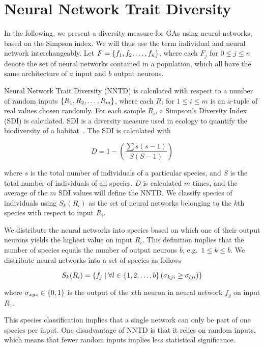 \section{Neural Network Trait Diversity}
In the following, we present a diversity measure for GAs using neural networks, based on the Simpson index. We will thus use the term individual and neural network interchangeably. Let $F = \{ f_1, f_2, \dots, f_n \}$, where each $F_j$ for $0 \leq j \leq n$ denote the set of neural networks contained in a population, which all have the same architecture of $a$ input and $b$ output neurons. 

Neural Network Trait Diversity (NNTD) is calculated with respect to a number of random inputs $\{ R_1, R_2, \dots, R_m \}$, where each $R_i$ for $1 \leq i \leq m$ is an $a$-tuple of real values chosen randomly. For each sample $R_i$, a Simpson's Diversity Index (SDI) is calculated. SDI is a diversity measure used in ecology to quantify the biodiversity of a habitat~\cite{simpson1949measurement}. The SDI is calculated with 

\begin{equation*}\label{eq:sdi}
  D = 1 - \left(\frac{\sum{s (s - 1)}}{S (S - 1)}\right) 
\end{equation*}

where $s$ is the total number of individuals of a particular species, and $S$ is the total number of individuals of all species. $D$ is calculated $m$ times, and the average of the $m$ SDI values will define the NNTD. We classify species of individuals using $S_k(R_i)$ as the set of neural networks belonging to the $k$th species with respect to input $R_i$.

We distribute the neural networks into species based on which one of their output neurons yields the highest value on input $R_i$. %
This definition implies that the number of species equals the number of output neurons $b$, e.g.\ $1 \leq k \leq b$. We distribute neural networks into a set of species as follows

%
\begin{equation*}\label{eq:species}
  S_k(R_i) = \{ f_j \mid \forall l \in \{ 1, 2, \dots, b \} \left(\sigma_{kji} \geq \sigma_{lji}\right) \}
\end{equation*}
%

where $\sigma_{xyz} \in \{ 0, 1 \}$ is the output of the $x$th neuron in neural network $f_y$ on input $R_z$.

This species classification implies that a single network can only be part of one species per input. One disadvantage of NNTD is that it relies on random inputs, which means that fewer random inputs implies less statistical significance.

